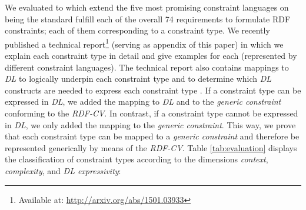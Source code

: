 \documentclass{llncs}
\newenvironment{evaluation-generic-overview}{
  \vspace{0cm}
	\begin{center}
  \begin{tabular}{l|c|c}
  \hline
  \textbf{Constraint Classes} & \textbf{\#} & \textbf{\%} \\
  \hline

}{
  \hline
  \end{tabular}
	\end{center}
}
\begin{document}
{We evaluated to which extend the five most promising constraint languages on being the standard fulfill each of the overall 74 requirements to formulate RDF constraints; each of them corresponding to a constraint type.
We recently published a technical report\footnote{Available at: \url{http://arxiv.org/abs/1501.03933}} (serving as appendix of this paper) in which we explain each constraint type in detail and give examples for each (represented by different constraint languages).
The technical report also contains mappings to \emph{DL} to logically underpin each constraint type and to determine which \emph{DL} constructs are needed to express each constraint type \cite{BoschNolleAcarEckert2015}.
If a constraint type can be expressed in \emph{DL}, we added the mapping to \emph{DL} and to the \emph{generic constraint} conforming to the \emph{RDF-CV}.
In contrast, if a constraint type cannot be expressed in \emph{DL}, we only added the mapping to the \emph{generic constraint}.
This way, we prove that each constraint type can be mapped to a \emph{generic constraint} and therefore be represented generically by means of the \emph{RDF-CV}.
Table \ref{tab:evaluation} displays the classification of constraint types according to the dimensions \emph{context}, \emph{complexity}, and \emph{DL expressivity}:


}
\end{document}
